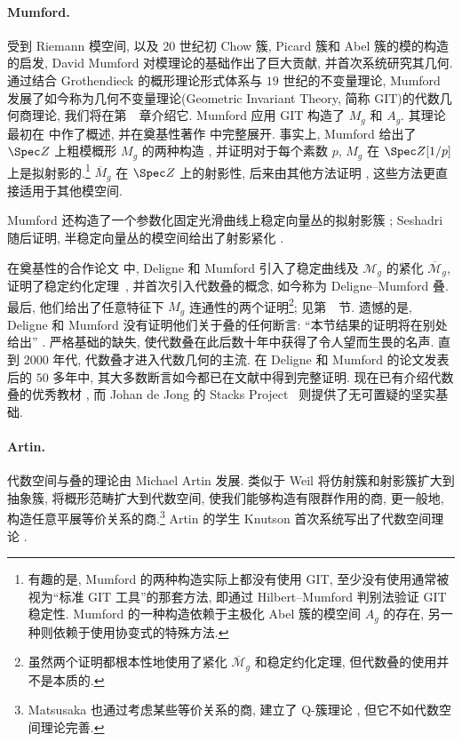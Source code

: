 \paragraph*{Mumford.} 受到 Riemann 模空间, 以及 $20$ 世纪初 Chow 簇, Picard 簇和 Abel 簇的模的构造的启发, David Mumford 对模理论的基础作出了巨大贡献, 并首次系统研究其几何. 通过结合 Grothendieck 的概形理论形式体系与 $19$ 世纪的不变量理论, Mumford 发展了如今称为几何不变量理论(Geometric Invariant Theory, 简称 GIT)的代数几何商理论, 我们将在第~~章介绍它. Mumford 应用 GIT 构造了 $M_g$ 和 $A_g$. 其理论最初在 \cite{Mum61} 中作了概述, 并在奠基性著作 \cite{GIT} 中完整展开. 事实上, Mumford 给出了 $\Spec\mathbb Z$ 上粗模概形 $M_g$ 的两种构造 \cite[定理 $5.11$ 和 $7.13$]{GIT}, 并证明对于每个素数 $p$, $M_g$ 在 $\Spec\mathbb Z[1/p]$ 上是拟射影的.\footnote{有趣的是, Mumford 的两种构造实际上都没有使用 GIT, 至少没有使用通常被视为``标准 GIT 工具''的那套方法, 即通过 Hilbert--Mumford 判别法验证 GIT 稳定性. Mumford 的一种构造依赖于主极化 Abel 簇的模空间 $A_g$ 的存在, 另一种则依赖于使用协变式的特殊方法.} $\overline M_g$ 在 $\Spec\mathbb Z$ 上的射影性, 后来由其他方法证明 \cite{Knu83b,Mum77,Gie82}, 这些方法更直接适用于其他模空间.

Mumford 还构造了一个参数化固定光滑曲线上稳定向量丛的拟射影簇 \cite{Mum63}; Seshadri 随后证明, 半稳定向量丛的模空间给出了射影紧化 \cite{Ses67}.

在奠基性的合作论文 \cite{DM69} 中, Deligne 和 Mumford 引入了稳定曲线及 $\mathcal M_g$ 的紧化 $\overline{\mathcal M}_g$, 证明了稳定约化定理~, 并首次引入代数叠的概念, 如今称为 Deligne--Mumford 叠. 最后, 他们给出了任意特征下 $M_g$ 连通性的两个证明\footnote{虽然两个证明都根本性地使用了紧化 $\overline{\mathcal M}_g$ 和稳定约化定理, 但代数叠的使用并不是本质的.}; 见第~~节. 遗憾的是, Deligne 和 Mumford 没有证明他们关于叠的任何断言: ``本节结果的证明将在别处给出'' \cite[第 $76$ 页]{DM69}. 严格基础的缺失, 使代数叠在此后数十年中获得了令人望而生畏的名声. 直到 $2000$ 年代, 代数叠才进入代数几何的主流. 在 Deligne 和 Mumford 的论文发表后的 $50$ 多年中, 其大多数断言如今都已在文献中得到完整证明. 现在已有介绍代数叠的优秀教材 \cite{LMB00,Ols16}, 而 Johan de Jong 的 Stacks Project~\cite{SP} 则提供了无可置疑的坚实基础.

\paragraph*{Artin.} 代数空间与叠的理论由 Michael Artin 发展. 类似于 Weil 将仿射簇和射影簇扩大到抽象簇, 将概形范畴扩大到代数空间, 使我们能够构造有限群作用的商, 更一般地, 构造任意平展等价关系的商.\footnote{Matsusaka 也通过考虑某些等价关系的商, 建立了 Q-簇理论 \cite{Mat64}, 但它不如代数空间理论完善.} Artin 的学生 Knutson 首次系统写出了代数空间理论 \cite{Knu71}.

